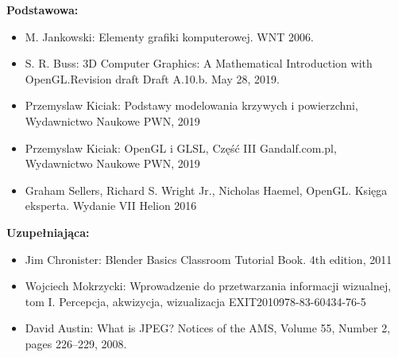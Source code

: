 \documentclass[12pt, a4paper]{article}
\begin{document}
\textbf{Podstawowa:}
\begin{itemize}
  \item M. Jankowski: Elementy grafiki komputerowej. WNT 2006.
  \item S. R. Buss: 3D Computer Graphics: A Mathematical Introduction with OpenGL.Revision draft Draft A.10.b. May 28, 2019.
  \item Przemyslaw Kiciak: Podstawy modelowania krzywych i powierzchni, Wydawnictwo Naukowe PWN, 2019
  \item Przemyslaw Kiciak: OpenGL i GLSL, Część III Gandalf.com.pl, Wydawnictwo Naukowe PWN, 2019
  \item Graham Sellers, Richard S. Wright Jr., Nicholas Haemel, OpenGL. Księga eksperta. Wydanie VII Helion 2016
\end{itemize}

\textbf{Uzupełniająca:}
\begin{itemize}
  \item Jim Chronister: Blender Basics Classroom Tutorial Book. 4th edition, 2011
  \item Wojciech Mokrzycki: Wprowadzenie do przetwarzania informacji wizualnej, tom I. Percepcja, akwizycja, wizualizacja EXIT2010978-83-60434-76-5
  \item David Austin: What is JPEG? Notices of the AMS, Volume 55, Number 2, pages 226–229, 2008.
\end{itemize}
\end{document}
